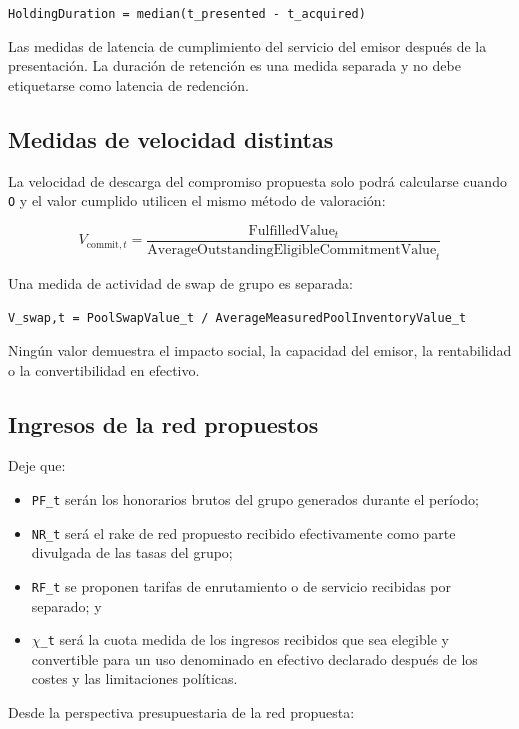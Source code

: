 \documentclass[11pt]{article}
\begin{document}
\texttt{HoldingDuration = median(t\_presented - t\_acquired)}

Las medidas de latencia de cumplimiento del servicio del emisor después de la presentación. La duración de retención es una medida separada y no debe etiquetarse como latencia de redención.

\subsection*{Medidas de velocidad distintas}

La velocidad de descarga del compromiso propuesta solo podrá calcularse cuando \texttt{O} y el valor cumplido utilicen el mismo método de valoración:

\[
V_{\mathrm{commit},t} = \frac{\mathrm{FulfilledValue}_t}{\mathrm{AverageOutstandingEligibleCommitmentValue}_t}
\]

Una medida de actividad de swap de grupo es separada:

\texttt{V\_swap,t = PoolSwapValue\_t / AverageMeasuredPoolInventoryValue\_t}

Ningún valor demuestra el impacto social, la capacidad del emisor, la rentabilidad o la convertibilidad en efectivo.

\subsection*{Ingresos de la red propuestos}

Deje que:

\begin{itemize}[leftmargin=*]
\item \texttt{PF\_t} serán los honorarios brutos del grupo generados durante el período;
\item \texttt{NR\_t} será el rake de red propuesto recibido efectivamente como parte divulgada de las tasas del grupo;
\item \texttt{RF\_t} se proponen tarifas de enrutamiento o de servicio recibidas por separado; y
\item \texttt{$\chi$\_t} será la cuota medida de los ingresos recibidos que sea elegible y convertible para un uso denominado en efectivo declarado después de los costes y las limitaciones políticas.
\end{itemize}
Desde la perspectiva presupuestaria de la red propuesta:
\end{document}
